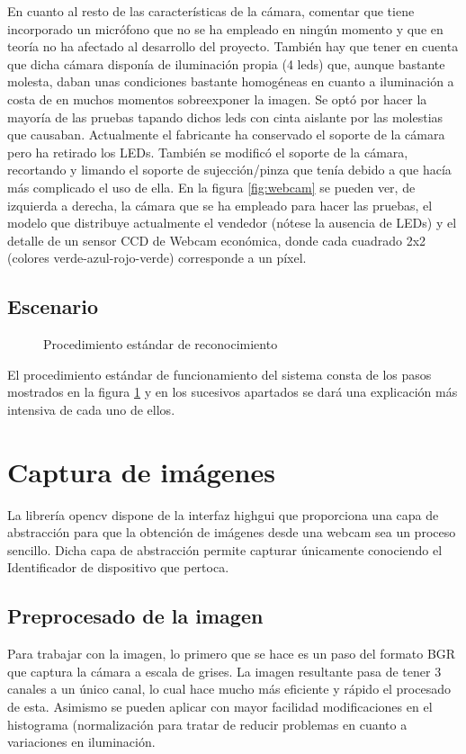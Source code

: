 En cuanto al resto de las características de la cámara, comentar que tiene incorporado un micrófono que no se ha empleado en ningún momento y que en teoría no ha afectado al desarrollo del proyecto. También hay que tener en cuenta que dicha cámara disponía de iluminación propia (4 leds) que, aunque bastante molesta, daban unas condiciones bastante homogéneas en cuanto a iluminación a costa de en muchos momentos sobreexponer la imagen. Se optó por hacer la mayoría de las pruebas tapando dichos leds con cinta aislante por las molestias que causaban. Actualmente el fabricante ha conservado el soporte de la cámara pero ha retirado los LEDs. También se modificó el soporte de la cámara, recortando y limando el soporte de sujección/pinza que tenía debido a que hacía más complicado el uso de ella. En la figura \ref{fig:webcam} se pueden ver, de izquierda a derecha, la cámara que se ha empleado para hacer las pruebas, el modelo que distribuye actualmente el vendedor (nótese la ausencia de LEDs) y el detalle de un sensor CCD de Webcam económica, donde cada cuadrado 2x2 (colores verde-azul-rojo-verde) corresponde a un píxel.

\subsection{Escenario}
\begin{figure}[h!]
        \centering
        
        \caption{Procedimiento estándar de reconocimiento}
	\label{fig:pasos_captura}
\end{figure}

El procedimiento estándar de funcionamiento del sistema consta de los pasos mostrados en la figura \ref{fig:pasos_captura} y en los sucesivos apartados se dará una explicación más intensiva de cada uno de ellos.

\section{Captura de imágenes}
La librería opencv dispone de la interfaz highgui que proporciona una capa de abstracción para que la obtención de imágenes desde una webcam sea un proceso sencillo. Dicha capa de abstracción permite capturar únicamente conociendo el Identificador de dispositivo que pertoca.

\subsection{Preprocesado de la imagen}
Para trabajar con la imagen, lo primero que se hace es un paso del formato BGR que captura la cámara a escala de grises. La imagen resultante pasa de tener 3 canales a un único canal, lo cual hace mucho más eficiente y rápido el procesado de esta. Asimismo se pueden aplicar con mayor facilidad modificaciones en el histograma (normalización para tratar de reducir problemas en cuanto a variaciones en iluminación.


